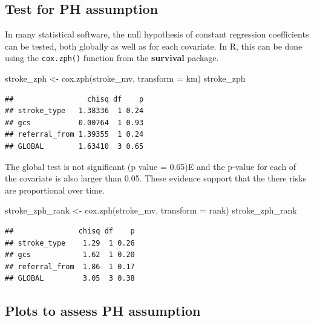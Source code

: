 \documentclass[
  10pt,
]{krantz}
\newenvironment{Shaded}{\begin{snugshade}}{\end{snugshade}}
\newcommand{\AttributeTok}[1]{\textcolor[rgb]{0.77,0.63,0.00}{#1}}
\newcommand{\FunctionTok}[1]{\textcolor[rgb]{0.00,0.00,0.00}{#1}}
\newcommand{\NormalTok}[1]{#1}
\newcommand{\OtherTok}[1]{\textcolor[rgb]{0.56,0.35,0.01}{#1}}
\newcommand{\StringTok}[1]{\textcolor[rgb]{0.31,0.60,0.02}{#1}}
\begin{document}
\hypertarget{test-for-ph-assumption}{%
\subsection{Test for PH assumption}\label{test-for-ph-assumption}}

In many statistical software, the null hypothesis of constant regression coefficients can be tested, both globally as well as for each covariate. In R, this can be done using the \texttt{cox.zph()} function from the \textbf{survival} package.

\begin{Shaded}
\begin{Highlighting}[]
\NormalTok{stroke\_zph }\OtherTok{\textless{}{-}} \FunctionTok{cox.zph}\NormalTok{(stroke\_mv, }\AttributeTok{transform =} \StringTok{\textquotesingle{}km\textquotesingle{}}\NormalTok{)}
\NormalTok{stroke\_zph}
\end{Highlighting}
\end{Shaded}

\begin{verbatim}
##                 chisq df    p
## stroke_type   1.38336  1 0.24
## gcs           0.00764  1 0.93
## referral_from 1.39355  1 0.24
## GLOBAL        1.63410  3 0.65
\end{verbatim}

The global test is not significant (p value = 0.65)E and the p-value for each of the covariate is also larger than 0.05. These evidence support that the there risks are proportional over time.

\begin{Shaded}
\begin{Highlighting}[]
\NormalTok{stroke\_zph\_rank }\OtherTok{\textless{}{-}} \FunctionTok{cox.zph}\NormalTok{(stroke\_mv, }\AttributeTok{transform =} \StringTok{\textquotesingle{}rank\textquotesingle{}}\NormalTok{)}
\NormalTok{stroke\_zph\_rank}
\end{Highlighting}
\end{Shaded}

\begin{verbatim}
##               chisq df    p
## stroke_type    1.29  1 0.26
## gcs            1.62  1 0.20
## referral_from  1.86  1 0.17
## GLOBAL         3.05  3 0.38
\end{verbatim}

\hypertarget{plots-to-assess-ph-assumption}{%
\subsection{Plots to assess PH assumption}\label{plots-to-assess-ph-assumption}}
\end{document}
